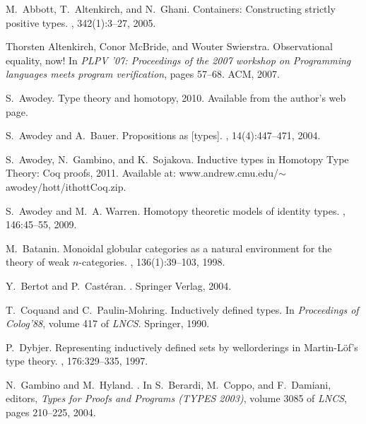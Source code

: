 \documentclass{article}
\theoremstyle{remark}
\theoremstyle{definition}
\begin{document}
\begin{thebibliography}{10}

M.~Abbott, T.~Altenkirch, and N.~Ghani.
\newblock Containers: Constructing strictly positive types.
, 342(1):3--27, 2005.

Thorsten Altenkirch, Conor McBride, and Wouter Swierstra.
\newblock Observational equality, now!
\newblock In {\em PLPV '07: Proceedings of the 2007 workshop on Programming
  languages meets program verification}, pages 57--68. ACM, 2007.

S.~Awodey.
\newblock Type theory and homotopy, 2010.
\newblock Available from the author's web page.

S.~Awodey and A.~Bauer.
\newblock Propositions as [types].
, 14(4):447--471, 2004.

S.~Awodey, N.~Gambino, and K.~Sojakova.
\newblock Inductive types in {H}omotopy {T}ype {T}heory: {C}oq proofs, 2011.
\newblock Available at: www.andrew.cmu.edu/$\sim$awodey/hott/ithottCoq.zip.

S.~Awodey and M.~A. Warren.
\newblock Homotopy theoretic models of identity types.
, 146:45--55, 2009.

M.~Batanin.
\newblock Monoidal globular categories as a natural environment for the theory
  of weak $n$-categories.
, 136(1):39--103, 1998.

Y.~Bertot and P.~Cast{\'e}ran.
.
\newblock Springer Verlag, 2004.

T.~Coquand and C.~Paulin-Mohring.
\newblock Inductively defined types.
\newblock In {\em Proceedings of Colog'88}, volume 417 of {\em LNCS}. Springer,
  1990.

P.~Dybjer.
\newblock Representing inductively defined sets by wellorderings in
  {M}artin-{L}{\"o}f's type theory.
, 176:329--335, 1997.

N.~Gambino and M.~Hyland.
.
\newblock In S.~Berardi, M.~Coppo, and F.~Damiani, editors, {\em Types for
  Proofs and Programs (TYPES 2003)}, volume 3085 of {\em LNCS}, pages 210--225,
  2004.


\end{thebibliography}
\end{document}
